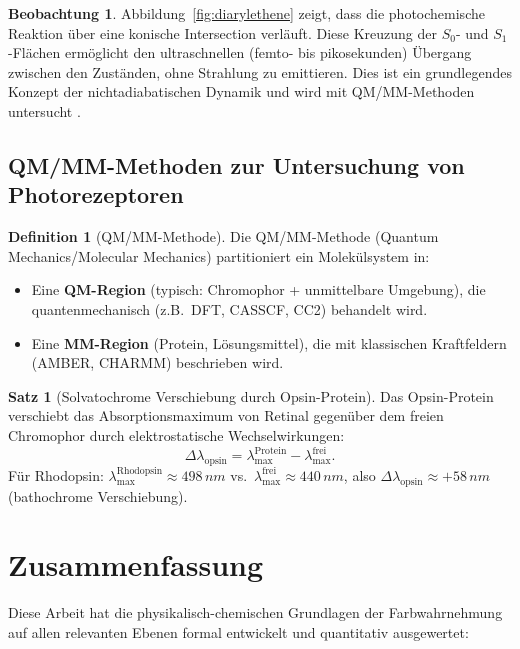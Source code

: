 ﻿\documentclass[a4paper,12pt]{article}
\theoremstyle{definition}
\newtheorem{definition}{Definition}
\newtheorem{satz}{Satz}
\newtheorem{beobachtung}{Beobachtung}
\begin{document}
\begin{beobachtung}
Abbildung~\ref{fig:diarylethene} zeigt, dass die photochemische Reaktion über eine
konische Intersection verläuft. Diese Kreuzung der $S_0$- und $S_1$-Flächen
ermöglicht den ultraschnellen (femto- bis pikosekunden) Übergang zwischen den Zuständen,
ohne Strahlung zu emittieren. Dies ist ein grundlegendes Konzept der
nichtadiabatischen Dynamik und wird mit QM/MM-Methoden untersucht
\cite{gozem2012}.
\end{beobachtung}

\subsection{QM/MM-Methoden zur Untersuchung von Photorezeptoren}

\begin{definition}[QM/MM-Methode]
Die QM/MM-Methode (Quantum Mechanics/Molecular Mechanics) partitioniert ein Molekülsystem in:
\begin{itemize}
  \item Eine \textbf{QM-Region} (typisch: Chromophor + unmittelbare Umgebung),
        die quantenmechanisch (z.B.\ DFT, CASSCF, CC2) behandelt wird.
  \item Eine \textbf{MM-Region} (Protein, Lösungsmittel),
        die mit klassischen Kraftfeldern (AMBER, CHARMM) beschrieben wird.
\end{itemize}
\end{definition}

\begin{satz}[Solvatochrome Verschiebung durch Opsin-Protein]
Das Opsin-Protein verschiebt das Absorptionsmaximum von Retinal gegenüber dem freien
Chromophor durch elektrostatische Wechselwirkungen:
\[
  \Delta\lambda_{\mathrm{opsin}} = \lambda_{\max}^{\mathrm{Protein}} - \lambda_{\max}^{\mathrm{frei}}.
\]
Für Rhodopsin: $\lambda_{\max}^{\mathrm{Rhodopsin}} \approx 498\,\si{nm}$ vs.\
$\lambda_{\max}^{\mathrm{frei}} \approx 440\,\si{nm}$,
also $\Delta\lambda_{\mathrm{opsin}} \approx +58\,\si{nm}$ (bathochrome Verschiebung).
\end{satz}

\section{Zusammenfassung}

Diese Arbeit hat die physikalisch-chemischen Grundlagen der Farbwahrnehmung
auf allen relevanten Ebenen formal entwickelt und quantitativ ausgewertet:
\end{document}
